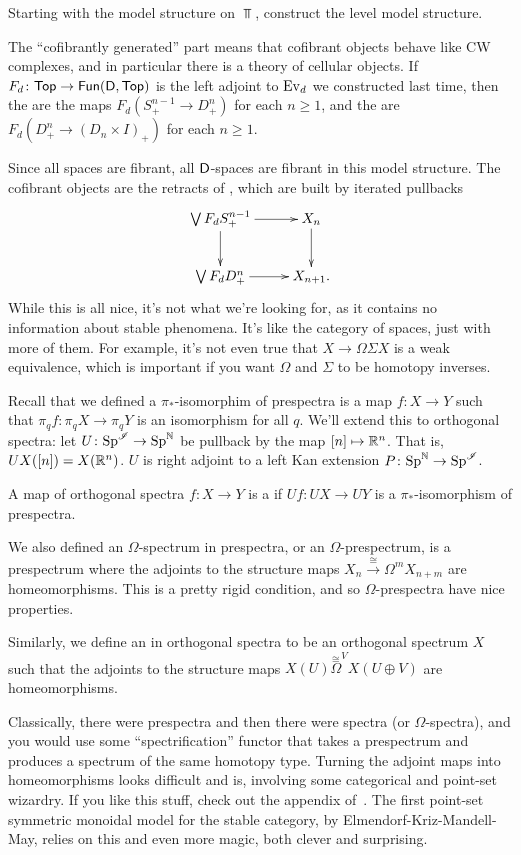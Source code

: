 \begin{ex}
Starting with the model structure on $\Top$, construct the level model structure.
\end{ex}
The ``cofibrantly generated'' part means that cofibrant objects behave like CW complexes, and in particular there
is a theory of cellular objects. If $F_d\colon\mathsf{Top}\to\mathsf{Fun}(\mathsf D,\mathsf{Top})$ is the left adjoint to $\operatorname{Ev}_d$ we constructed
last time, then the  are the maps $F_d(S_+^{n-1}\to D_+^n)$ for each $n\ge 1$, and
the  are $F_d(D_+^n\to (D_n\times I)_+)$ for each $n\ge 1$.

Since all spaces are fibrant, all $\mathsf D$-spaces are fibrant in this model structure. The cofibrant objects are the
retracts of , which are built by iterated pullbacks
\[\xymatrix{
	\bigvee F_d S_+^{n-1}\ar[r]\ar[d] & X_n\ar[d]\\
	\bigvee F_dD_+^n\ar[r] & X_{n+1}.
}\]
While this is all nice, it's not what we're looking for, as it contains no information about stable phenomena. It's
like the category of spaces, just with more of them. For example, it's not even true that $X\to\Omega\Sigma X$ is a
weak equivalence, which is important if you want $\Omega$ and $\Sigma$ to be homotopy inverses.

Recall that we defined a $\pi_*$-isomorphim of prespectra is a map $f\colon X\to Y$ such that $\pi_qf\colon \pi_q
X\to\pi_q Y$ is an isomorphism for all $q$. We'll extend this to orthogonal spectra: let $U\colon\mathrm{Sp}^\mathscr I\to\mathrm{Sp}^\mathbb N$
be pullback by the map $[n]\mapsto\R^n$. That is, $UX([n]) = X(\mathbb R^n)$. $U$ is right adjoint to a left Kan extension
$P\colon\mathrm{Sp}^\mathbb N\to\mathrm{Sp}^\mathscr I$.
\begin{defn}
A map of orthogonal spectra $f\colon X\to Y$ is a  if $Uf\colon UX\to UY$ is a
$\pi_*$-isomorphism of prespectra.
\end{defn}
We also defined an $\Omega$-spectrum in prespectra, or an $\Omega$-prespectrum, is a prespectrum where the adjoints
to the structure maps $X_n\stackrel\cong\to\Omega^mX_{n+m}$ are homeomorphisms. This is a pretty rigid condition,
and so $\Omega$-prespectra have nice properties.
\begin{defn}
Similarly, we define an  in orthogonal spectra to be an orthogonal spectrum $X$ such that
the adjoints to the structure maps $X(U)\stackrel\cong\Omega^V X(U\oplus V)$ are homeomorphisms.
\end{defn}
Classically, there were prespectra and then there were spectra (or $\Omega$-spectra), and you would use some
``spectrification'' functor that takes a prespectrum and produces a spectrum of the same homotopy type. Turning the
adjoint maps into homeomorphisms looks difficult and is, involving some categorical and point-set wizardry. If you
like this stuff, check out the appendix of~\cite{LMS}. The first point-set symmetric monoidal model for the stable
category, by Elmendorf-Kriz-Mandell-May, relies on this and even more magic, both clever and surprising.

